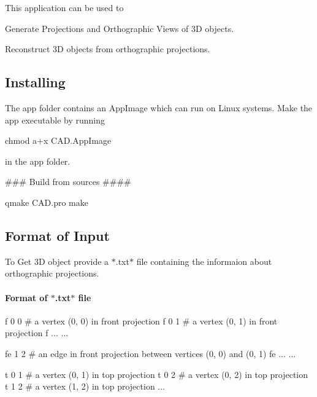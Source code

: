 This application can be used to
\begin{DoxyEnumerate}
\item Generate Projections and Orthographic Views of 3D objects.
\end{DoxyEnumerate}


\begin{DoxyEnumerate}
\item Reconstruct 3D objects from orthographic projections.
\end{DoxyEnumerate}



\subsection*{Installing}

\begin{DoxyVerb}The app folder contains an AppImage which can run on Linux systems. 
Make the app executable by running 

chmod a+x CAD.AppImage 

in the app folder.
\end{DoxyVerb}


\#\#\# Build from sources \#\#\#\# 
\begin{DoxyCode}
qmake CAD.pro
make
\end{DoxyCode}


\subsection*{Format of Input}


\begin{DoxyEnumerate}
\item To Get 3D object provide a $\ast$.txt$\ast$ file containing the informaion about orthographic projections. \paragraph*{Format of $\ast$.txt$\ast$ file}
\end{DoxyEnumerate}

f 0 0 \# a vertex (0, 0) in front projection f 0 1 \# a vertex (0, 1) in front projection f ... ...

fe 1 2 \# an edge in front projection between vertices (0, 0) and (0, 1) fe ... ...

t 0 1 \# a vertex (0, 1) in top projection t 0 2 \# a vertex (0, 2) in top projection t 1 2 \# a vertex (1, 2) in top projection ...

